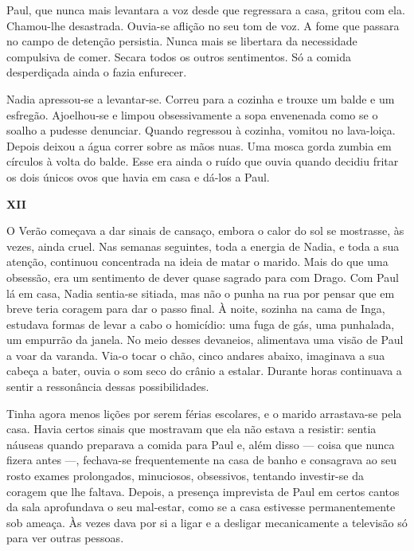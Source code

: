 Paul, que nunca mais levantara a voz desde que regressara a casa,
gritou com ela. Chamou-lhe desastrada. Ouvia-se aflição no seu tom de voz. A fome que passara no campo de detenção
persistia. Nunca mais se libertara da necessidade compulsiva de comer.
Secara todos os outros sentimentos. Só a comida desperdiçada ainda o
fazia enfurecer.

Nadia apressou-se a levantar-se. Correu para a cozinha e trouxe um balde
e um esfregão. Ajoelhou-se e limpou obsessivamente a sopa envenenada
como se o soalho a pudesse denunciar. Quando regressou à cozinha,
vomitou no lava-loiça. Depois deixou a água correr sobre as mãos nuas.
Uma mosca gorda zumbia em círculos à volta do balde. Esse era ainda o
ruído que ouvia quando decidiu fritar os dois únicos ovos que havia em
casa e dá-los a Paul.

\pagebreak
\vspace*{1.8cm}
\noindent{}\textbf{XII}

\bigskip

O Verão começava a dar sinais de cansaço, embora o calor do sol se
mostrasse, às vezes, ainda cruel. Nas semanas seguintes, toda a
energia de Nadia, e toda a sua atenção, continuou concentrada na ideia
de matar o marido. Mais do que uma obsessão, era um sentimento de dever
quase sagrado para com Drago. Com Paul lá em casa, Nadia sentia-se
sitiada, mas não o punha na rua por pensar que em breve teria coragem
para dar o passo final. À noite, sozinha na cama de Inga, estudava
formas de levar a cabo o homicídio: uma fuga de gás, uma punhalada, um
empurrão da janela. No meio desses devaneios, alimentava uma visão de
Paul a voar da varanda. Via-o tocar o chão, cinco andares abaixo,
imaginava a sua cabeça a bater, ouvia o som seco do crânio a estalar.
Durante horas continuava a sentir a ressonância dessas possibilidades.

Tinha agora menos lições por serem férias escolares, e
o marido arrastava-se pela casa. Havia certos sinais que mostravam que
ela não estava a resistir: sentia náuseas quando preparava a comida para
Paul e, além disso --- coisa que nunca fizera antes ---, fechava-se
frequentemente na
casa de banho e consagrava ao seu rosto exames prolongados,
minuciosos, obsessivos, tentando investir-se da coragem que lhe faltava.
Depois, a presença imprevista de Paul em certos cantos da sala
aprofundava o seu mal-estar, como se a casa estivesse permanentemente
sob ameaça. Às vezes dava por si a ligar e a desligar mecanicamente a
televisão só para ver outras pessoas.

